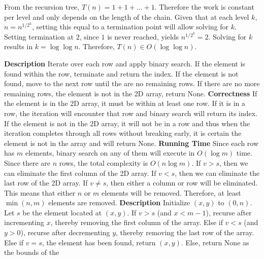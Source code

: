 \documentclass[12pt,twoside]{article}
\begin{document}
\begin{problems}
\begin{problemparts}
\begin{enumerate}[i.]
\begin{center}
      \end{center}
      From the recursion tree, $ T(n) = 1 + 1 + \ldots + 1 $. Therefore the work
        is constant per level and only depends on the length of the chain. Given
        that at each level $ k $, $ n = n^{1/2^k} $, setting this equal to a
        termination point will allow solving for $ k $. Setting termination at $
        2 $, since $ 1 $ is never reached, yields $ n^{1/2^k} = 2 $. Solving for
        $ k $ results in $ k = \log \log n $.  Therefore, $T(n) \in O(\log \log
        n)$.
\end{enumerate}
\end{problemparts}

\newpage
\problem  %

\begin{problemparts}
\problempart \textbf{Description} Iterate over each row and apply binary search.
    If the element is found within the row, terminate and return the index. If
    the element is not found, move to the next row until the are no remaining
    rows. If there are no more remaining rows, the element is not in the 2D
    array, return None.
    \smallbreak
    \textbf{Correctness} If the element is in the 2D array, it must be within at
    least one row. If it is in a row, the iteration will encounter that row and
    binary search will return its index. If the element is not in the 2D array,
    it will not be in a row and thus when the iteration completes through all
    rows without breaking early, it is certain the element is not in the array
    and will return None.
    \smallbreak
    \textbf{Running Time} Since each row has $ m $ elements, binary search on
    any of them will execute in $ O(\log m) $ time. Since there are $ n $ rows,
    the total complexity is $ O(n \log m) $.
\problempart If $ v > s $, then we can eliminate the first column of the 2D
    array. If $ v < s $, then we can eliminate the last row of the 2D array. If
    $ v \neq s $, then either a column or row will be eliminated. This means
    that either $ n $ or $ m $ elements will be removed. Therefore, at least $
    \min (n, m) $ elements are removed.
\problempart \textbf{Description} Initialize $ (x, y) $ to $ (0, n) $. Let $ s $
    be the element located at $ (x, y) $. If $ v > s $ (and $ x < m - 1 $),
    recurse after incrementing $ x $, thereby removing the first column of the
    array. Else if $ v < s $ (and $ y > 0 $), recurse after decrementing $ y $,
    thereby removing the last row of the array. Else if $ v = s $, the element
    has been found, return $ (x, y) $.  Else, return None as the bounds of the

\end{problemparts}
\end{problems}
\end{document}
